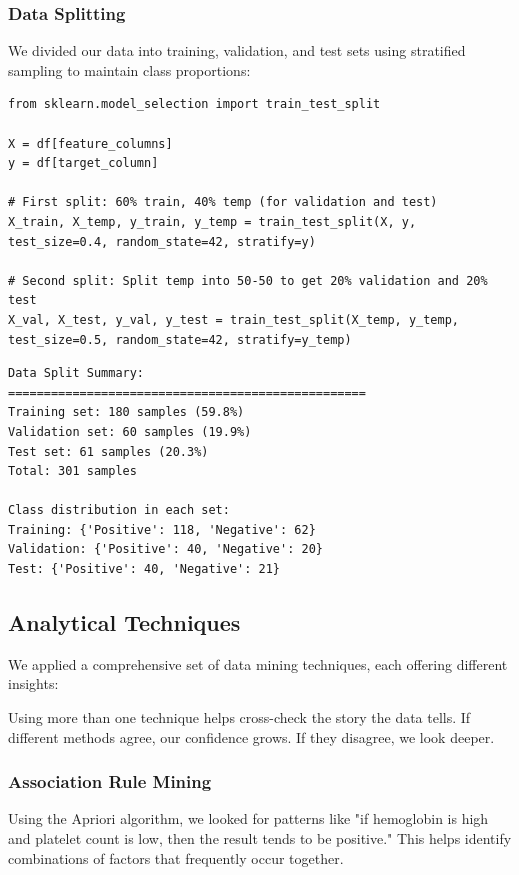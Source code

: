 \documentclass[12pt,a4paper]{article}
\begin{document}
\subsubsection{Data Splitting}

We divided our data into training, validation, and test sets using stratified sampling to maintain class proportions:

\begin{lstlisting}
from sklearn.model_selection import train_test_split

X = df[feature_columns]
y = df[target_column]

# First split: 60% train, 40% temp (for validation and test)
X_train, X_temp, y_train, y_temp = train_test_split(X, y, test_size=0.4, random_state=42, stratify=y)

# Second split: Split temp into 50-50 to get 20% validation and 20% test
X_val, X_test, y_val, y_test = train_test_split(X_temp, y_temp, test_size=0.5, random_state=42, stratify=y_temp)
\end{lstlisting}

\begin{verbatim}
Data Split Summary:
==================================================
Training set: 180 samples (59.8%)
Validation set: 60 samples (19.9%)
Test set: 61 samples (20.3%)
Total: 301 samples

Class distribution in each set:
Training: {'Positive': 118, 'Negative': 62}
Validation: {'Positive': 40, 'Negative': 20}
Test: {'Positive': 40, 'Negative': 21}
\end{verbatim}

\subsection{Analytical Techniques}

We applied a comprehensive set of data mining techniques, each offering different insights:

Using more than one technique helps cross-check the story the data tells. If different methods agree, our confidence grows. If they disagree, we look deeper.

\subsubsection{Association Rule Mining}

Using the Apriori algorithm, we looked for patterns like "if hemoglobin is high and platelet count is low, then the result tends to be positive." This helps identify combinations of factors that frequently occur together.
\end{document}
